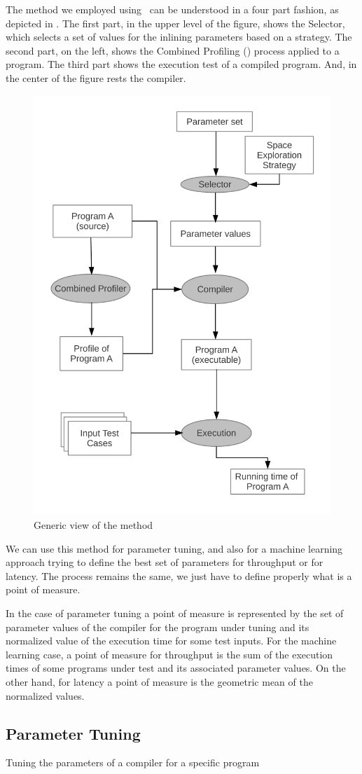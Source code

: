 
The method we employed using \CP\ can be understood in a four part
fashion, as depicted in . The first part, in
the upper level of the figure, shows the Selector, which selects a
set of values for the inlining parameters based on a strategy. The
second part, on the left, shows the Combined Profiling (\CP) process
applied to a program. The third part shows the execution test of a
compiled program. And, in the center of the figure rests the compiler.

\begin{figure}
  \centering
  \includegraphics[width=0.50\linewidth]{Figures/genView}
  \caption{Generic view of the method}
  \label{fig:genView}
\end{figure}

We can use this method for parameter tuning, and also for a machine
learning approach trying to define the best set of parameters for
throughput or for latency. The process remains the same, we just have
to define properly what is a point of measure.

In the case of parameter tuning a point of measure is represented by
the set of parameter values of the compiler for the program under tuning
and its normalized value of the execution time for some test inputs. For
the machine learning case, a point of measure for throughput is the sum
of the execution times of some programs under test and its associated
parameter values. On the other hand, for latency a point of measure is
the geometric mean of the normalized values.

\subsection{Parameter Tuning}

Tuning the parameters of a compiler for a specific program 